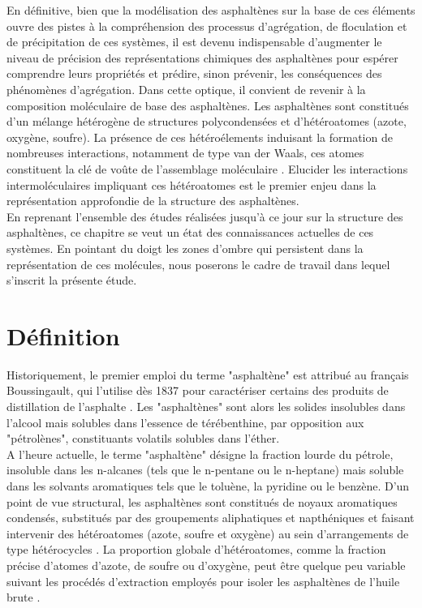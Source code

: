 	
	En définitive, bien que la modélisation des asphaltènes sur la base de ces éléments ouvre des pistes à la compréhension des processus d'agrégation, de floculation et de précipitation de ces systèmes, il est devenu indispensable d'augmenter le niveau de précision des représentations chimiques des asphaltènes pour espérer comprendre leurs propriétés et prédire, sinon prévenir, les conséquences des phénomènes d'agrégation. 
	Dans cette optique, il convient de revenir à la composition moléculaire de base des asphaltènes. Les asphaltènes sont constitués d'un mélange hétérogène de structures polycondensées et d'hétéroatomes (azote, oxygène, soufre). La présence de ces hétéroélements induisant la formation de nombreuses interactions, notamment de type van der Waals, ces atomes constituent la clé de voûte de l'assemblage moléculaire \cite{zhang2013speciation, coelho2012elucidation}. Elucider les interactions intermoléculaires impliquant ces hétéroatomes est le premier enjeu dans la représentation approfondie de la structure des asphaltènes.  \\
	
	En reprenant l'ensemble des études réalisées jusqu'à ce jour sur la structure des asphaltènes, ce chapitre se veut un état des connaissances actuelles de ces systèmes. En pointant du doigt les zones d'ombre qui persistent dans la représentation de ces molécules, nous poserons le cadre de travail dans lequel s'inscrit la présente étude. 
	
	
	
	\newpage	
	
	\section{Définition}
	Historiquement, le premier emploi du terme "asphaltène" est attribué au français Boussingault, qui l'utilise dès 1837 pour caractériser certains des produits de distillation de l'asphalte \cite{goual2012petroleum}. Les "asphaltènes" sont alors les solides insolubles dans l'alcool mais solubles dans l'essence de térébenthine, par opposition aux "pétrolènes", constituants volatils solubles dans l'éther. \\
	A l'heure actuelle, le terme "asphaltène" désigne la fraction lourde du pétrole, insoluble dans les n-alcanes (tels que le n-pentane ou le n-heptane) mais soluble dans les solvants aromatiques tels que le toluène, la pyridine ou le benzène. D'un point de vue structural, les asphaltènes sont constitués de noyaux aromatiques condensés, substitués par des groupements aliphatiques et napthéniques et faisant intervenir des hétéroatomes (azote, soufre et oxygène) au sein d'arrangements de type hétérocycles \cite{strausz1992molecular}. La proportion globale d'hétéroatomes, comme la fraction précise d'atomes d'azote, de soufre ou d'oxygène, peut être quelque peu variable suivant les procédés d'extraction employés pour isoler les asphaltènes de l'huile brute \cite{calles2007properties}.
	
